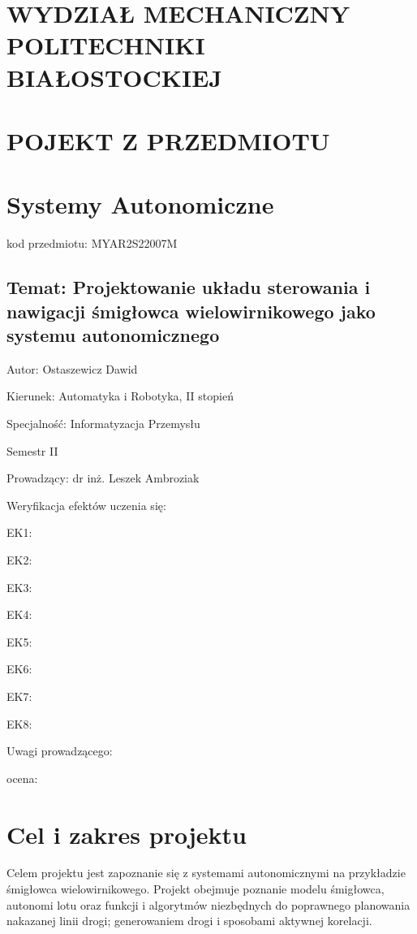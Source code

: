 \documentclass[polish,11pt,a4paper]{article}
\begin{document}
\centering
\section*{WYDZIAŁ MECHANICZNY POLITECHNIKI BIAŁOSTOCKIEJ}
\section*{POJEKT Z PRZEDMIOTU}
\section*{Systemy Autonomiczne}
\large
kod przedmiotu: MYAR2S22007M
\subsection*{Temat: Projektowanie układu sterowania i nawigacji
śmigłowca wielowirnikowego jako systemu
autonomicznego }
\vspace{2cm}
\raggedright
Autor: Ostaszewicz Dawid

Kierunek: Automatyka i Robotyka, II stopień

Specjalność: Informatyzacja Przemysłu

Semestr II

Prowadzący: dr inż. Leszek Ambroziak
\vspace{2cm}

Weryfikacja efektów uczenia się:

EK1: \dotso

EK2: \dotso

EK3: \dotso

EK4: \dotso

EK5: \dotso

EK6: \dotso

EK7: \dotso

EK8: \dotso

Uwagi prowadzącego:
\vspace{3cm}

ocena: \dotso
\clearpage
\justifying
\section*{Cel i zakres projektu}
Celem projektu jest zapoznanie się z systemami autonomicznymi na przykładzie śmigłowca
wielowirnikowego. Projekt obejmuje poznanie modelu śmigłowca, autonomi lotu oraz funkcji
i algorytmów niezbędnych do poprawnego planowania nakazanej linii drogi; generowaniem
drogi i sposobami aktywnej korelacji. 
\end{document}
